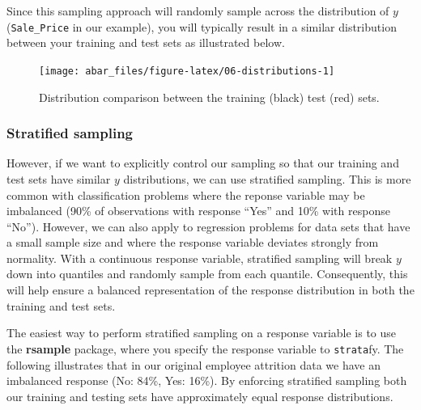 \documentclass[]{book}
\theoremstyle{definition}
\theoremstyle{definition}
\theoremstyle{definition}
\theoremstyle{remark}
\begin{document}
Since this sampling approach will randomly sample across the
distribution of \(y\) (\texttt{Sale\_Price} in our example), you will
typically result in a similar distribution between your training and
test sets as illustrated below.

\begin{figure}

{\centering \texttt{[image: abar\_files/figure-latex/06-distributions-1]} 

}

\caption{Distribution comparison between the training (black) test (red) sets.}\label{fig:06-distributions}
\end{figure}

\hypertarget{stratified-sampling}{%
\subsubsection{Stratified sampling}\label{stratified-sampling}}

However, if we want to explicitly control our sampling so that our
training and test sets have similar \(y\) distributions, we can use
stratified sampling. This is more common with classification problems
where the reponse variable may be imbalanced (90\% of observations with
response ``Yes'' and 10\% with response ``No''). However, we can also
apply to regression problems for data sets that have a small sample size
and where the response variable deviates strongly from normality. With a
continuous response variable, stratified sampling will break \(y\) down
into quantiles and randomly sample from each quantile. Consequently,
this will help ensure a balanced representation of the response
distribution in both the training and test sets.

The easiest way to perform stratified sampling on a response variable is
to use the \textbf{rsample} package, where you specify the response
variable to \texttt{strata}fy. The following illustrates that in our
original employee attrition data we have an imbalanced response (No:
84\%, Yes: 16\%). By enforcing stratified sampling both our training and
testing sets have approximately equal response distributions.
\end{document}
